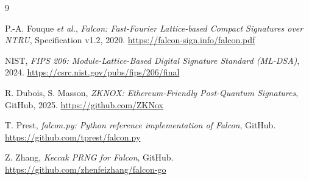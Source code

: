 \documentclass[11pt,a4paper]{article}
\begin{document}
\newpage
\begin{thebibliography}{9}

  P.-A. Fouque \emph{et al.},
  \textit{Falcon: Fast-Fourier Lattice-based Compact Signatures over NTRU},
  Specification v1.2, 2020.
  \url{https://falcon-sign.info/falcon.pdf}

  NIST,
  \textit{FIPS 206: Module-Lattice-Based Digital Signature Standard (ML-DSA)},
  2024.
  \url{https://csrc.nist.gov/pubs/fips/206/final}

  R. Dubois, S. Masson,
  \textit{ZKNOX: Ethereum-Friendly Post-Quantum Signatures},
  GitHub, 2025.
  \url{https://github.com/ZKNox}

  T. Prest,
  \textit{falcon.py: Python reference implementation of Falcon},
  GitHub.
  \url{https://github.com/tprest/falcon.py}

  Z. Zhang,
  \textit{Keccak PRNG for Falcon},
  GitHub.
  \url{https://github.com/zhenfeizhang/falcon-go}

\end{thebibliography}
\end{document}
